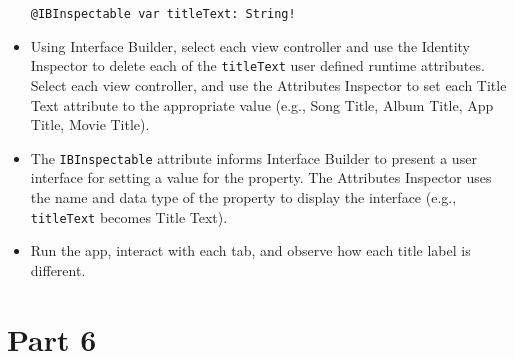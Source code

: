 \documentclass[a4paper,11pt]{scrartcl}
\begin{document}
\begin{itemize}
\begin{lstlisting}
@IBInspectable var titleText: String!
\end{lstlisting}
\item Using Interface Builder, select each view controller and use the Identity Inspector to delete each of the \texttt{titleText} user defined runtime attributes. Select each view controller, and use the Attributes Inspector to set each Title Text attribute to the appropriate value (e.g., Song Title, Album Title, App Title, Movie Title).
\item The \texttt{IBInspectable} attribute informs Interface Builder to present a user interface for setting a value for the property. The Attributes Inspector uses the name and data type of the property to display the interface (e.g., \texttt{titleText} becomes Title Text).
\item Run the app, interact with each tab, and observe how each title label is different.
\end{itemize}

\section*{Part 6}
\end{document}
